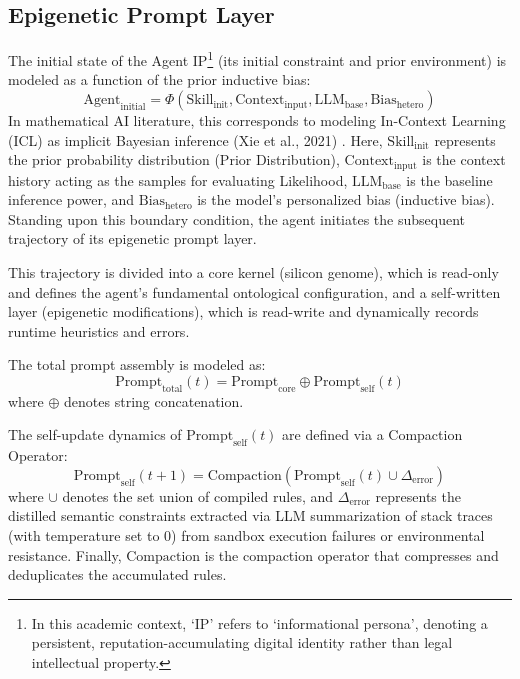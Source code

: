 \documentclass[10pt,journal,compsoc]{IEEEtran}
\begin{document}
\subsection{Epigenetic Prompt Layer}
The initial state of the Agent IP\footnote{In this academic context, `IP' refers to `informational persona', denoting a persistent, reputation-accumulating digital identity rather than legal intellectual property.} (its initial constraint and prior environment) is modeled as a function of the prior inductive bias:
\begin{equation}
\text{Agent}_{\text{initial}} = \Phi(\text{Skill}_{\text{init}}, \text{Context}_{\text{input}}, \text{LLM}_{\text{base}}, \text{Bias}_{\text{hetero}})
\end{equation}
In mathematical AI literature, this corresponds to modeling In-Context Learning (ICL) as implicit Bayesian inference (Xie et al., 2021) \cite{xie2021}. Here, $\text{Skill}_{\text{init}}$ represents the prior probability distribution (Prior Distribution), $\text{Context}_{\text{input}}$ is the context history acting as the samples for evaluating Likelihood, $\text{LLM}_{\text{base}}$ is the baseline inference power, and $\text{Bias}_{\text{hetero}}$ is the model's personalized bias (inductive bias). Standing upon this boundary condition, the agent initiates the subsequent trajectory of its epigenetic prompt layer.

This trajectory is divided into a core kernel (silicon genome), which is read-only and defines the agent's fundamental ontological configuration, and a self-written layer (epigenetic modifications), which is read-write and dynamically records runtime heuristics and errors.

The total prompt assembly is modeled as:
\begin{equation}
\text{Prompt}_{\text{total}}(t) = \text{Prompt}_{\text{core}} \oplus \text{Prompt}_{\text{self}}(t)
\end{equation}
where $\oplus$ denotes string concatenation.

The self-update dynamics of $\text{Prompt}_{\text{self}}(t)$ are defined via a Compaction Operator:
\begin{equation}
\text{Prompt}_{\text{self}}(t+1) = \text{Compaction}(\text{Prompt}_{\text{self}}(t) \cup \Delta_{\text{error}})
\end{equation}
where $\cup$ denotes the set union of compiled rules, and $\Delta_{\text{error}}$ represents the distilled semantic constraints extracted via LLM summarization of stack traces (with temperature set to 0) from sandbox execution failures or environmental resistance. Finally, $\text{Compaction}$ is the compaction operator that compresses and deduplicates the accumulated rules.
\end{document}
